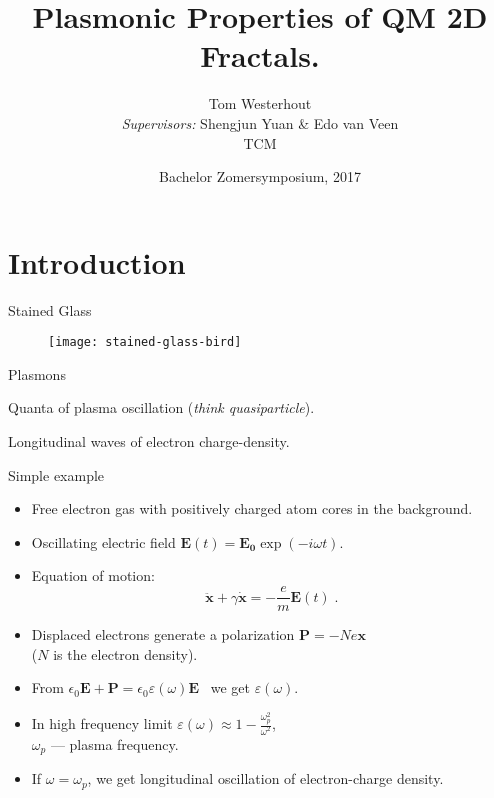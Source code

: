 \documentclass{beamer}
\title{Plasmonic Properties of QM 2D Fractals.}
\author{Tom Westerhout \\ 
        \emph{Supervisors:} Shengjun Yuan \& Edo van Veen \\
        TCM}
\date[BZ 2017]{Bachelor Zomersymposium, 2017}
\begin{document}
\begin{frame}
    \titlepage
\end{frame}

\section{Introduction}

\begin{frame}{Stained Glass}
    \begin{figure}
    \texttt{[image: stained-glass-bird]}
    \end{figure}
\end{frame}

\begin{frame}{Plasmons}
    \begin{definition}[Plasmon]
        Quanta of plasma oscillation (\emph{think quasiparticle}).
    \end{definition}

    \begin{definition}
        Longitudinal waves of electron charge-density.
    \end{definition}
\end{frame}

\begin{frame}{Simple example}
    \begin{itemize}
    \item<1-> Free electron gas with positively charged atom cores in the background.
    \item<1-> Oscillating electric field $\mathbf{E}(t) = \mathbf{E_0}\exp(-i\omega t)$.
    \item<2-> Equation of motion: \[ \mathbf{\ddot{x}} + \gamma\mathbf{\dot{x}} = -\frac{e}{m}\mathbf{E}(t)\; .\]
    \item<3-> Displaced electrons generate a polarization $\mathbf{P} = -Ne\mathbf{x}$ \\ ($N$ is the electron density).
    \item<4-> From $\epsilon_0\mathbf{E} + \mathbf{P} = \epsilon_0\varepsilon(\omega)\mathbf{E}$ \ we get $\varepsilon(\omega)$.
    \item<4-> In high frequency limit $\varepsilon(\omega) \approx 1 - \frac{\omega_p^2}{\omega^2}$, \\ $\omega_p$ --- \alert{plasma frequency}.
    \item<5-> If $\omega = \omega_p$, we get longitudinal oscillation of electron-charge density.
    \end{itemize}
\end{frame}
\end{document}
